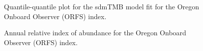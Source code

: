 \documentclass[
]{scrartcl}
\begin{document}
\begin{figure}


\caption{\label{fig-orfs_qqplot}Quantile-quantile plot for the sdmTMB
model fit for the Oregon Onboard Observer (ORFS) index.}

\end{figure}%

\begin{figure}


\caption{\label{fig-ORFS_index}Annual relative index of abundance for
the Oregon Onboard Observer (ORFS) index.}

\end{figure}%
\end{document}
